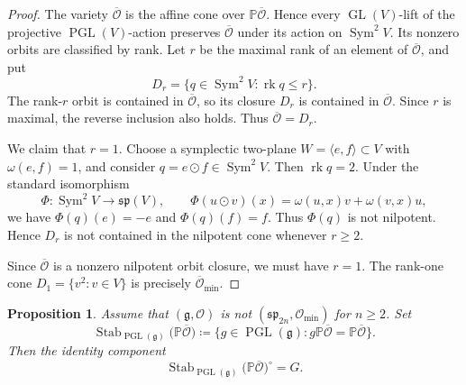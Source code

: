 \documentclass[12pt]{article}
\newtheorem{proposition}[theorem]{Proposition}
\theoremstyle{remark}
\theoremstyle{plain}
\DeclareMathOperator{\rk}{rk}
\DeclareMathOperator{\Sym}{Sym}
\begin{document}
\begin{proof}
The variety $\overline{\mathcal O}$ is the affine cone over
$\mathbb P\overline{\mathcal O}$.
Hence every $\operatorname{GL}(V)$-lift of the projective
$\operatorname{PGL}(V)$-action preserves $\overline{\mathcal O}$ under
its action on $\Sym^2V$.
Its nonzero orbits are classified by rank.
Let $r$ be the maximal rank of an element of $\overline{\mathcal O}$,
and put
\[
D_r=\{q\in\Sym^2V:\rk q\leq r\}.
\]
The rank-$r$ orbit is contained in $\overline{\mathcal O}$, so its
closure $D_r$ is contained in $\overline{\mathcal O}$.
Since $r$ is maximal, the reverse inclusion also holds.
Thus $\overline{\mathcal O}=D_r$.

We claim that $r=1$.
Choose a symplectic two-plane $W=\langle e,f\rangle\subset V$ with
$\omega(e,f)=1$, and consider $q=e\odot f\in\Sym^2V$.
Then $\rk q=2$.
Under the standard isomorphism
\[
\Phi:\Sym^2V\longrightarrow\mathfrak{sp}(V),
\qquad
\Phi(u\odot v)(x)=\omega(u,x)v+\omega(v,x)u,
\]
we have $\Phi(q)(e)=-e$ and $\Phi(q)(f)=f$.
Thus $\Phi(q)$ is not nilpotent.
Hence $D_r$ is not contained in the nilpotent cone whenever $r\geq2$.

Since $\overline{\mathcal O}$ is a nonzero nilpotent orbit closure, we
must have $r=1$. The rank-one cone
$D_1=\{v^2:v\in V\}$ is precisely
$\overline{\mathcal O}_{\min}$.
\end{proof}

\begin{proposition}\label{prop:projective-stabilizer}
Assume that
$(\mathfrak g,\mathcal O)$ is not
$(\mathfrak{sp}_{2n},\mathcal O_{\min})$ for $n\geq2$.
Set
\[
\operatorname{Stab}_{\operatorname{PGL}(\mathfrak g)}
\bigl(\mathbb P\overline{\mathcal O}\bigr)
\coloneqq
\{g\in\operatorname{PGL}(\mathfrak g):
g\mathbb P\overline{\mathcal O}
=\mathbb P\overline{\mathcal O}\}.
\]
Then the identity component
\[
\operatorname{Stab}_{\operatorname{PGL}(\mathfrak g)}
\bigl(\mathbb P\overline{\mathcal O}\bigr)^\circ
=G.
\]
\end{proposition}
\end{document}
